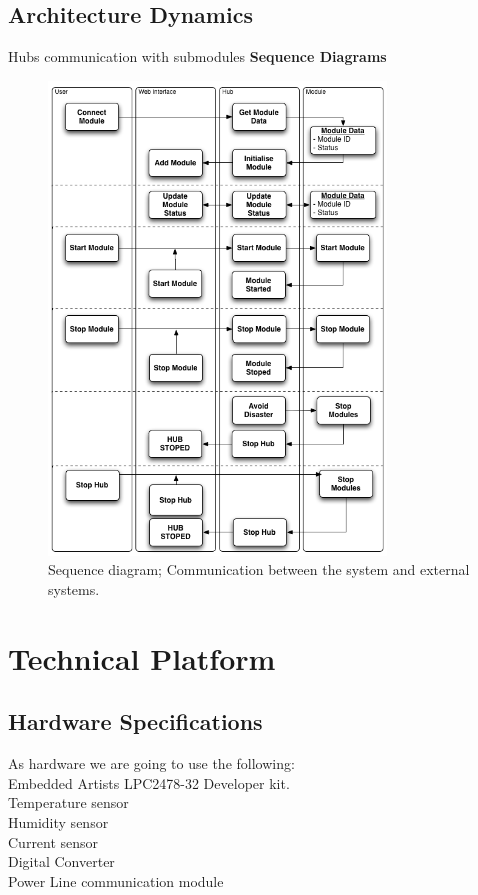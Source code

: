 \subsection{Architecture Dynamics}
Hubs communication with submodules
\textbf{Sequence Diagrams}
\begin{figure}[H]
	\begin{centering}
		 \includegraphics[width=0.8\textwidth]{images/SequenceDiagram.png}
		\caption{Sequence diagram; Communication between the system and external systems.}
 	\end{centering}
\end{figure}	

\section{Technical Platform}

\subsection{Hardware Specifications}
As hardware we are going to use the following: 
\\Embedded Artists LPC2478-32 Developer kit.
\\Temperature sensor
\\Humidity sensor
\\Current sensor
\\Digital Converter
\\Power Line communication module

